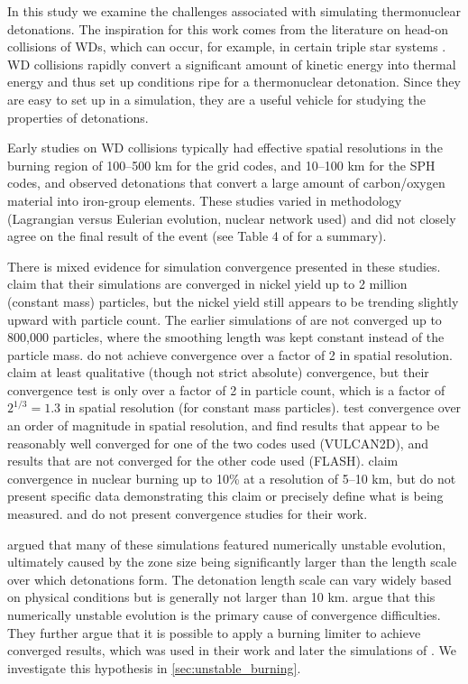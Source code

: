 \documentclass[twocolumn,numberedappendix,trackchanges]{../aastex62}
\begin{document}
In this study we examine the challenges associated with simulating thermonuclear detonations.
The inspiration for this work comes from the literature on head-on collisions of WDs,
which can occur, for example, in certain triple star systems \citep{thompson:2011,hamers:2013}.
WD collisions rapidly convert a significant amount of kinetic energy into thermal energy and
thus set up conditions ripe for a thermonuclear detonation. Since they are easy to set up in a simulation,
they are a useful vehicle for studying the properties of detonations.

Early studies on WD collisions \citep{rosswog:2009,raskin:2010,loren-aguilar:2010,
hawley:2012,garcia-senz:2013} typically had effective spatial resolutions in the burning region of
100--500 km for the grid codes, and 10--100 km for the SPH codes, and observed
detonations that convert a large amount of carbon/oxygen material into iron-group elements.
These studies varied in methodology (Lagrangian versus Eulerian evolution, nuclear network
used) and did not closely agree on the final result of the event (see Table 4 of
\cite{garcia-senz:2013} for a summary).

There is mixed evidence for simulation convergence presented in these studies.
\cite{raskin:2010} claim that their simulations are converged in nickel yield up to 2 million
(constant mass) particles, but the nickel yield still appears to be trending slightly upward
with particle count. The earlier simulations of \cite{raskin:2009} are not converged up to
800,000 particles, where the smoothing length was kept constant instead of the particle mass.
\cite{hawley:2012} do not achieve convergence over a factor of 2 in spatial resolution.
\cite{garcia-senz:2013} claim at least qualitative (though not strict absolute) convergence, but
their convergence test is only over a factor of 2 in particle count, which is a factor of $2^{1/3} = 1.3$
in spatial resolution (for constant mass particles). \cite{kushnir:2013} test convergence over an
order of magnitude in spatial resolution, and find results that appear to be reasonably well
converged for one of the two codes used (VULCAN2D), and results that are not converged for the
other code used (FLASH). \cite{papish:2015} claim convergence in nuclear burning up to 10\% at a
resolution of 5--10 km, but do not present specific data demonstrating this claim or precisely define
what is being measured. \cite{loren-aguilar:2010} and \cite{rosswog:2009} do not present convergence
studies for their work.

\cite{kushnir:2013} argued that many of these simulations featured numerically unstable evolution,
ultimately caused by the zone size being significantly larger than the length scale over which
detonations form. The detonation length scale can vary widely based on physical conditions
\citep{seitenzahl:2009,garg:2017} but is generally not larger than 10 km. \citeauthor{kushnir:2013}
argue that this numerically unstable evolution is the primary cause of convergence difficulties.
They further argue that it is possible to apply a burning limiter to achieve converged results,
which was used in their work and later the simulations of \cite{papish:2015}. We investigate
this hypothesis in \autoref{sec:unstable_burning}.
\end{document}
